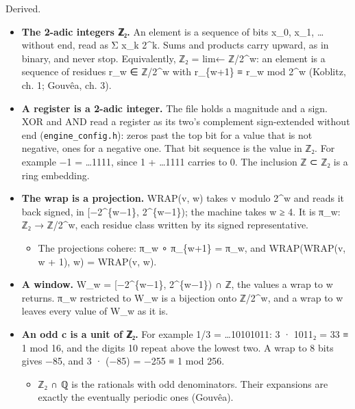 Derived.

\begin{itemize}
\item \textbf{The 2-adic integers ℤ₂.} An element is a sequence of bits x\_\allowbreak{}0, x\_\allowbreak{}1, … without end, read as Σ x\_\allowbreak{}k 2\textasciicircum{}k. Sums and products carry upward, as in binary, and never stop. Equivalently, ℤ₂ = lim← ℤ/2\textasciicircum{}w: an element is a sequence of residues r\_\allowbreak{}w ∈ ℤ/2\textasciicircum{}w with r\_\allowbreak{}\{w+1\} ≡ r\_\allowbreak{}w mod 2\textasciicircum{}w (Koblitz, ch. 1; Gouvêa, ch. 3).
\item \textbf{A register is a 2-adic integer.} The file holds a magnitude and a sign. XOR and AND read a register as its two's complement sign-extended without end (\texttt{engine\_\allowbreak{}config.\allowbreak{}h}): zeros past the top bit for a value that is not negative, ones for a negative one. That bit sequence is the value in ℤ₂. For example −1 = …1111, since 1 + …1111 carries to 0. The inclusion ℤ ⊂ ℤ₂ is a ring embedding.
\item \textbf{The wrap is a projection.} WRAP(v, w) takes v modulo 2\textasciicircum{}w and reads it back signed, in [−2\textasciicircum{}\{w−1\}, 2\textasciicircum{}\{w−1\}); the machine takes w ≥ 4. It is π\_\allowbreak{}w: ℤ₂ → ℤ/2\textasciicircum{}w, each residue class written by its signed representative.

\begin{itemize}
\item The projections cohere: π\_\allowbreak{}w ∘ π\_\allowbreak{}\{w+1\} = π\_\allowbreak{}w, and WRAP(WRAP(v, w + 1), w) = WRAP(v, w).
\end{itemize}
\item \textbf{A window.} W\_\allowbreak{}w = [−2\textasciicircum{}\{w−1\}, 2\textasciicircum{}\{w−1\}) ∩ ℤ, the values a wrap to w returns. π\_\allowbreak{}w restricted to W\_\allowbreak{}w is a bijection onto ℤ/2\textasciicircum{}w, and a wrap to w leaves every value of W\_\allowbreak{}w as it is.
\item \textbf{An odd c is a unit of ℤ₂.} For example 1/3 = …10101011: 3 · 1011₂ = 33 ≡ 1 mod 16, and the digits 10 repeat above the lowest two. A wrap to 8 bits gives −85, and 3 · (−85) = −255 ≡ 1 mod 256.

\begin{itemize}
\item ℤ₂ ∩ ℚ is the rationals with odd denominators. Their expansions are exactly the eventually periodic ones (Gouvêa).
\end{itemize}
\end{itemize}

